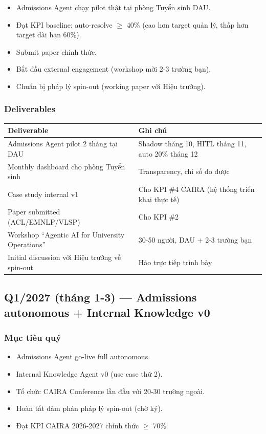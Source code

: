 \documentclass[11pt,a4paper]{article}
\begin{document}
\begin{itemize}
\item Admissions Agent chạy pilot thật tại phòng Tuyển sinh DAU.
\item Đạt KPI baseline: auto-resolve $\geq$ 40\% (cao hơn target quản lý, thấp hơn target dài hạn 60\%).
\item Submit paper chính thức.
\item Bắt đầu external engagement (workshop mời 2-3 trường bạn).
\item Chuẩn bị pháp lý spin-out (working paper với Hiệu trưởng).
\end{itemize}

\subsubsection*{Deliverables}

\begin{tabularx}{\linewidth}{@{}p{4cm} X@{}}
\toprule
\textbf{Deliverable} & \textbf{Ghi chú} \\
\midrule
Admissions Agent pilot 2 tháng tại DAU & Shadow tháng 10, HITL tháng 11, auto 20\% tháng 12 \\
Monthly dashboard cho phòng Tuyển sinh & Transparency, chỉ số đo được \\
Case study internal v1 & Cho KPI \#4 CAIRA (hệ thống triển khai thực tế) \\
Paper submitted (ACL/EMNLP/VLSP) & Cho KPI \#2 \\
Workshop ``Agentic AI for University Operations'' & 30-50 người, DAU + 2-3 trường bạn \\
Initial discussion với Hiệu trưởng về spin-out & Hảo trực tiếp trình bày \\
\bottomrule
\end{tabularx}

\subsection{Q1/2027 (tháng 1-3) — Admissions autonomous + Internal Knowledge v0}

\subsubsection*{Mục tiêu quý}

\begin{itemize}
\item Admissions Agent go-live full autonomous.
\item Internal Knowledge Agent v0 (use case thứ 2).
\item Tổ chức CAIRA Conference lần đầu với 20-30 trường ngoài.
\item Hoàn tất đàm phán pháp lý spin-out (chờ ký).
\item Đạt KPI CAIRA 2026-2027 chính thức $\geq$ 70\%.
\end{itemize}
\end{document}
